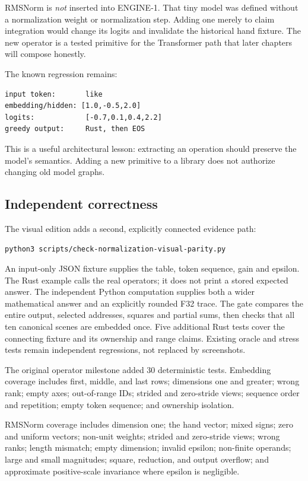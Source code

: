 \documentclass[
  10pt,
]{article}
\begin{document}
RMSNorm is \emph{not} inserted into ENGINE-1. That tiny model was
defined without a normalization weight or normalization step. Adding one
merely to claim integration would change its logits and invalidate the
historical hand fixture. The new operator is a tested primitive for the
Transformer path that later chapters will compose honestly.

The known regression remains:

\begin{verbatim}
input token:       like
embedding/hidden: [1.0,-0.5,2.0]
logits:            [-0.7,0.1,0.4,2.2]
greedy output:     Rust, then EOS
\end{verbatim}

This is a useful architectural lesson: extracting an operation should
preserve the model's semantics. Adding a new primitive to a library does
not authorize changing old model graphs.

\subsection{Independent correctness}\label{independent-correctness}

The visual edition adds a second, explicitly connected evidence path:

\begin{verbatim}
python3 scripts/check-normalization-visual-parity.py
\end{verbatim}

An input-only JSON fixture supplies the table, token sequence, gain and
epsilon. The Rust example calls the real operators; it does not print a
stored expected answer. The independent Python computation supplies both
a wider mathematical answer and an explicitly rounded F32 trace. The
gate compares the entire output, selected addresses, squares and partial
sums, then checks that all ten canonical scenes are embedded once. Five
additional Rust tests cover the connecting fixture and its ownership and
range claims. Existing oracle and stress tests remain independent
regressions, not replaced by screenshots.

The original operator milestone added 30 deterministic tests. Embedding
coverage includes first, middle, and last rows; dimensions one and
greater; wrong rank; empty axes; out-of-range IDs; strided and
zero-stride views; sequence order and repetition; empty token sequence;
and ownership isolation.

RMSNorm coverage includes dimension one; the hand vector; mixed signs;
zero and uniform vectors; non-unit weights; strided and zero-stride
views; wrong ranks; length mismatch; empty dimension; invalid epsilon;
non-finite operands; large and small magnitudes; square, reduction, and
output overflow; and approximate positive-scale invariance where epsilon
is negligible.
\end{document}
